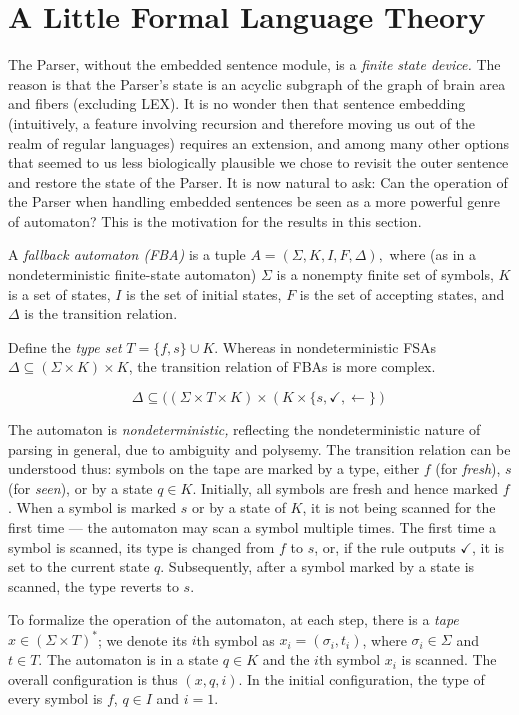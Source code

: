 \documentclass[11pt]{article}
\begin{document}
\section{A Little Formal Language Theory}
The Parser, without the embedded sentence module, is a {\em finite state device.}  The reason is that the Parser's state is an acyclic subgraph of the graph of brain area and fibers (excluding LEX).  It is no wonder then that sentence embedding (intuitively, a feature involving recursion and therefore moving us out of the realm of regular languages) requires an extension, and among many other options that seemed to us less biologically plausible we chose to revisit the outer sentence and restore the state of the Parser.  It is now natural to ask:  Can the operation of the Parser when handling embedded sentences be seen as a more powerful genre of automaton? This is the motivation for the results in this section.

\medskip{}  A {\em fallback automaton (FBA)} is a tuple $A=(\Sigma,K,I,F,\Delta),$ where (as in a nondeterministic finite-state automaton) $\Sigma$ is a nonempty finite set of symbols, $K$ is a set of states, $I$ is the set of initial states, $F$ is the set of accepting states, and $\Delta$ is the transition relation. 

Define the {\em type set} $T = \{f,s\}\cup K$. Whereas in nondeterministic FSAs $\Delta \subseteq (\Sigma\times K)\times K$, the transition relation of FBAs is more complex.

$$\Delta\subseteq
((\Sigma\times T \times K)\times(K \times \{s,\checkmark,\leftarrow\})$$

The automaton is {\em nondeterministic,} reflecting the nondeterministic nature of parsing in general, due to ambiguity and polysemy.  The transition relation  can be understood thus: symbols on the tape are marked by a type, either $f$ (for {\em fresh}), $s$ (for {\em seen}), or by a state $q \in K$. Initially, all symbols are fresh and hence marked $f$. When a symbol is marked $s$ or by a state of $K$, it is not being scanned for the first time --- the automaton may scan a symbol multiple times. The first time a symbol is scanned, its type is changed from $f$ to $s$, or, if the rule outputs $\checkmark$, it is set to the current state $q$. Subsequently, after a symbol marked by a state is scanned, the type reverts to $s$.  


To formalize the operation of the automaton, at each step, there is a {\em tape} $x\in (\Sigma\times T)^*$; we denote its $i$th symbol as $x_i=(\sigma_i,t_i)$,
where $\sigma_i\in\Sigma$ and $t \in T$.  The automaton is in a state $q\in K$ and the $i$th symbol $x_i$ is scanned.  The overall configuration is thus $(x,q,i)$.  In the initial configuration, the type of every symbol is $f$, $q\in I$ and $i=1$.  
\end{document}
